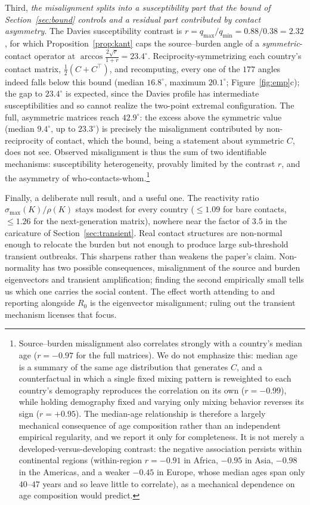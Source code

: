 \documentclass[12pt]{article}
\begin{document}
Third, \emph{the misalignment splits into a susceptibility part that the bound of Section~\ref{sec:bound} controls and a residual part contributed by contact asymmetry}. The Davies susceptibility contrast is $r=q_{\max}/q_{\min}=0.88/0.38=2.32$, for which Proposition~\ref{prop:kant} caps the source--burden angle of a \emph{symmetric}-contact operator at $\arccos\frac{2\sqrt r}{1+r}=23.4^{\circ}$. Reciprocity-symmetrizing each country's contact matrix, $\tfrac12(C+C^{\top})$, and recomputing, every one of the $177$ angles indeed falls below this bound (median $16.8^{\circ}$, maximum $20.1^{\circ}$; Figure~\ref{fig:emp}c); the gap to $23.4^{\circ}$ is expected, since the Davies profile has intermediate susceptibilities and so cannot realize the two-point extremal configuration. The full, asymmetric matrices reach $42.9^{\circ}$: the excess above the symmetric value (median $9.4^{\circ}$, up to $23.3^{\circ}$) is precisely the misalignment contributed by non-reciprocity of contact, which the bound, being a statement about symmetric $C$, does not see. Observed misalignment is thus the sum of two identifiable mechanisms: susceptibility heterogeneity, provably limited by the contrast $r$, and the asymmetry of who-contacts-whom.\footnote{Source--burden misalignment also correlates strongly with a country's median age ($r=-0.97$ for the full matrices). We do not emphasize this: median age is a summary of the same age distribution that generates $C$, and a counterfactual in which a single fixed mixing pattern is reweighted to each country's demography reproduces the correlation on its own ($r=-0.99$), while holding demography fixed and varying only mixing behavior reverses its sign ($r=+0.95$). The median-age relationship is therefore a largely mechanical consequence of age composition rather than an independent empirical regularity, and we report it only for completeness. It is not merely a developed-versus-developing contrast: the negative association persists within continental regions (within-region $r=-0.91$ in Africa, $-0.95$ in Asia, $-0.98$ in the Americas, and a weaker $-0.45$ in Europe, whose median ages span only $40$--$47$ years and so leave little to correlate), as a mechanical dependence on age composition would predict.}

Finally, a deliberate null result, and a useful one. The reactivity ratio $\sigma_{\max}(K)/\rho(K)$ stays modest for every country ($\le 1.09$ for bare contacts, $\le 1.26$ for the next-generation matrix), nowhere near the factor of $3.5$ in the caricature of Section~\ref{sec:transient}. Real contact structures are non-normal enough to relocate the burden but not enough to produce large sub-threshold transient outbreaks. This sharpens rather than weakens the paper's claim. Non-normality has two possible consequences, misalignment of the source and burden eigenvectors and transient amplification; finding the second empirically small tells us which one carries the social content. The effect worth attending to and reporting alongside $R_0$ is the eigenvector misalignment; ruling out the transient mechanism licenses that focus.
\end{document}
